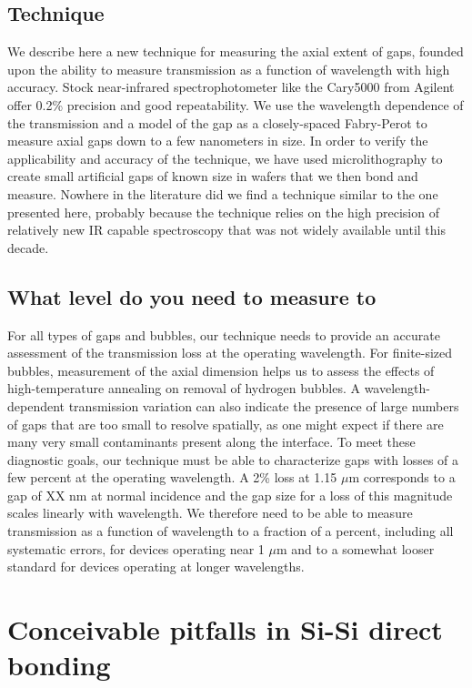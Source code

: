 \documentclass[osajnl,preprint,showpacs,superscriptaddress,12pt]{revtex4-1} %
\begin{document}
\subsection{Technique}
We describe here a new technique for measuring the axial extent of gaps, founded upon the ability to measure transmission as a function of wavelength with high accuracy.   Stock near-infrared spectrophotometer like the Cary5000 from Agilent offer 0.2\% precision and good repeatability.  We use the wavelength dependence of the transmission and a model of the gap as a closely-spaced Fabry-Perot to measure axial gaps down to a few nanometers in size.  In order to verify the applicability and accuracy of the technique, we have used microlithography to create small artificial gaps of known size in wafers that we then bond and measure.  Nowhere in the literature did we find a technique similar to the one presented here, probably because the technique relies on the high precision of relatively new IR capable spectroscopy that was not widely available until this decade.

\subsection{What level do you need to measure to}
For all types of gaps and bubbles, our technique needs to provide an accurate assessment of the transmission loss at the operating wavelength.  For finite-sized bubbles, measurement of the axial dimension helps us to assess the effects of high-temperature annealing on removal of hydrogen bubbles.  A wavelength-dependent transmission variation can also indicate the presence of large numbers of gaps that are too small to resolve spatially, as one might expect if there are many very small contaminants present along the interface.  To meet these diagnostic goals, our technique must be able to characterize gaps with losses of a few percent at the operating wavelength.  A 2\% loss at 1.15 $\mu$m corresponds to a gap of XX nm at normal incidence and the gap size for a loss of this magnitude scales linearly with wavelength.  We therefore need to be able to measure transmission as a function of wavelength to a fraction of a percent, including all systematic errors, for devices operating near 1 $\mu$m and to a somewhat looser standard for devices operating at longer wavelengths. 

\section{Conceivable pitfalls in Si-Si direct bonding}
\end{document}
